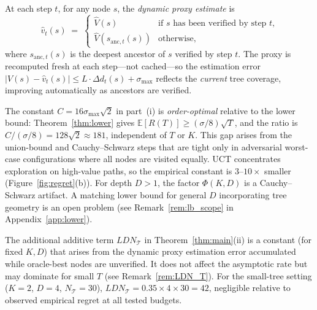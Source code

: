 \begin{definition}
\label{def:dynamic_proxy}
At each step $t$, for any node $s$, the \emph{dynamic proxy estimate} is
\[
  \hat{v}_t(s) \;=\;
  \begin{cases}
    \hat{V}(s) & \text{if $s$ has been verified by step $t$,}\\
    \hat{V}(s_{\mathrm{anc},t}(s)) & \text{otherwise,}
  \end{cases}
\]
where $s_{\mathrm{anc},t}(s)$ is the deepest ancestor of $s$ verified by step $t$.
The proxy is recomputed fresh at each step---not cached---so the estimation error
$|V(s) - \hat{v}_t(s)| \leq L\cdot\Delta d_t(s) + \sigma_{\max}$ reflects the
\emph{current} tree coverage, improving automatically as ancestors are verified.
\end{definition}

\begin{remark}
\label{rem:constant_tightness}
The constant $C = 16\sigma_{\max}\sqrt{2}$ in part~(i) is \emph{order-optimal}
relative to the lower bound: Theorem~\ref{thm:lower} gives
$\mathbb{E}[R(T)] \geq (\sigma/8)\sqrt{T}$, and the ratio is
$C/(\sigma/8) = 128\sqrt{2} \approx 181$, independent of $T$ or $K$.
This gap arises from the union-bound and Cauchy--Schwarz steps that are tight
only in adversarial worst-case configurations where all nodes are visited equally.
UCT concentrates exploration on high-value paths, so the empirical constant is
$3$--$10\times$ smaller (Figure~\ref{fig:regret}(b)).
For depth $D > 1$, the factor $\Phi(K,D)$ is a Cauchy--Schwarz artifact.
A matching lower bound for general $D$ incorporating tree geometry is an open
problem (see Remark~\ref{rem:lb_scope} in Appendix~\ref{app:lower}).

The additional additive term $LDN_{\mathcal{T}}$ in Theorem~\ref{thm:main}(ii) is
a constant (for fixed $K, D$) that arises from the dynamic proxy estimation error
accumulated while oracle-best nodes are unverified.  It does not affect the
asymptotic rate but may dominate for small $T$ (see Remark~\ref{rem:LDN_T}).
For the small-tree setting ($K{=}2$, $D{=}4$, $N_{\mathcal{T}}{=}30$),
$LDN_{\mathcal{T}} = 0.35 \times 4 \times 30 = 42$, negligible relative to observed
empirical regret at all tested budgets.
\end{remark}

